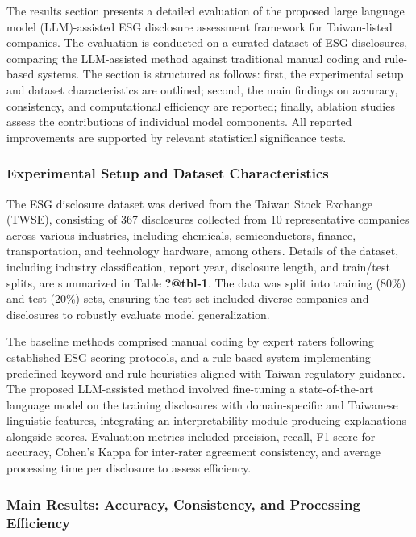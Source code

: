 \documentclass[
  12pt,
]{article}
\begin{document}
The results section presents a detailed evaluation of the proposed large
language model (LLM)-assisted ESG disclosure assessment framework for
Taiwan-listed companies. The evaluation is conducted on a curated
dataset of ESG disclosures, comparing the LLM-assisted method against
traditional manual coding and rule-based systems. The section is
structured as follows: first, the experimental setup and dataset
characteristics are outlined; second, the main findings on accuracy,
consistency, and computational efficiency are reported; finally,
ablation studies assess the contributions of individual model
components. All reported improvements are supported by relevant
statistical significance tests.

\subsubsection{Experimental Setup and Dataset
Characteristics}\label{experimental-setup-and-dataset-characteristics}

The ESG disclosure dataset was derived from the Taiwan Stock Exchange
(TWSE), consisting of 367 disclosures collected from 10 representative
companies across various industries, including chemicals,
semiconductors, finance, transportation, and technology hardware, among
others. Details of the dataset, including industry classification,
report year, disclosure length, and train/test splits, are summarized in
Table \textbf{?@tbl-1}. The data was split into training (80\%) and test
(20\%) sets, ensuring the test set included diverse companies and
disclosures to robustly evaluate model generalization.

The baseline methods comprised manual coding by expert raters following
established ESG scoring protocols, and a rule-based system implementing
predefined keyword and rule heuristics aligned with Taiwan regulatory
guidance. The proposed LLM-assisted method involved fine-tuning a
state-of-the-art language model on the training disclosures with
domain-specific and Taiwanese linguistic features, integrating an
interpretability module producing explanations alongside scores.
Evaluation metrics included precision, recall, F1 score for accuracy,
Cohen's Kappa for inter-rater agreement consistency, and average
processing time per disclosure to assess efficiency.

\subsubsection{Main Results: Accuracy, Consistency, and Processing
Efficiency}\label{main-results-accuracy-consistency-and-processing-efficiency}
\end{document}
